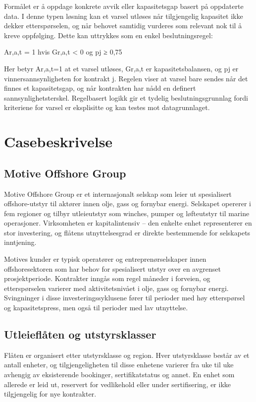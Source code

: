 \documentclass[a4paper,11pt]{article}
\begin{document}
Formålet er å oppdage konkrete avvik eller kapasitetsgap basert på oppdaterte data.   I denne typen løsning kan et varsel utløses når tilgjengelig kapasitet ikke dekker etterspørselen, og når behovet samtidig vurderes som relevant nok til å kreve oppfølging. Dette kan uttrykkes som en enkel beslutningsregel:

Ar,a,t = 1 hvis Gr,a,t < 0 og pj ≥ 0,75

Her betyr Ar,a,t=1 at et varsel utløses, Gr,a,t er kapasitetsbalansen, og pj er vinnersannsynligheten for kontrakt j. Regelen viser at varsel bare sendes når det finnes et kapasitetsgap, og når kontrakten har nådd en definert sannsynlighetsterskel. Regelbasert logikk gir et tydelig beslutningsgrunnlag fordi kriteriene for varsel er eksplisitte og kan testes mot datagrunnlaget.

\section{Casebeskrivelse}

\subsection{Motive Offshore Group}

Motive Offshore Group er et internasjonalt selskap som leier ut spesialisert offshore-utstyr til aktører innen olje, gass og fornybar energi. Selskapet opererer i fem regioner og tilbyr utleieutstyr som winches, pumper og løfteutstyr til marine operasjoner. Virksomheten er kapitalintensiv – den enkelte enhet representerer en stor investering, og flåtens utnyttelsesgrad er direkte bestemmende for selskapets inntjening.

Motives kunder er typisk operatører og entreprenørselskaper innen offshoresektoren som har behov for spesialisert utstyr over en avgrenset prosjektperiode. Kontrakter inngås som regel måneder i forveien, og etterspørselen varierer med aktivitetsnivået i olje, gass og fornybar energi. Svingninger i disse investeringssyklusene fører til perioder med høy etterspørsel og kapasitetspress, men også til perioder med lav utnyttelse.

\subsection{Utleieflåten og utstyrsklasser}

Flåten er organisert etter utstyrsklasse og region. Hver utstyrsklasse består av et antall enheter, og tilgjengeligheten til disse enhetene varierer fra uke til uke avhengig av eksisterende bookinger, sertifikatstatus og annet. En enhet som allerede er leid ut, reservert for vedlikehold eller under sertifisering, er ikke tilgjengelig for nye kontrakter.
\end{document}
